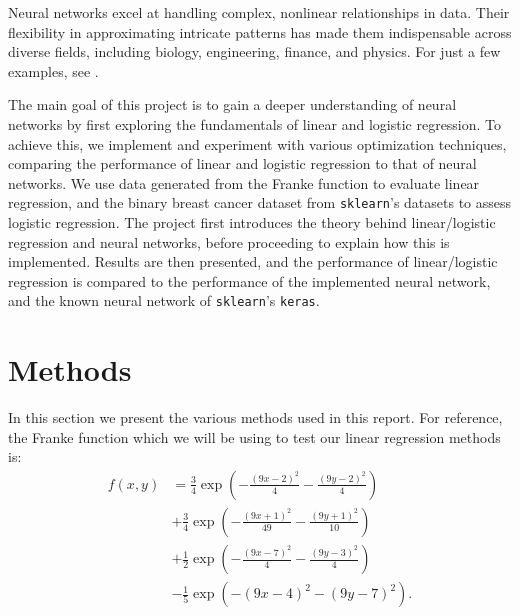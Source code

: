 \documentclass[%
reprint,s
amsmath,amssymb,
aps,
]{revtex4-2}
\begin{document}
Neural networks excel at handling complex, nonlinear relationships in data. Their flexibility in approximating intricate patterns has made them indispensable across diverse fields, including biology, engineering, finance, and physics. For just a few examples, see \cite{dawid2023modernapplicationsmachinelearning,thapar2023applicationsmachinelearningmodelling,mohammadi2022applicationsmachinelearninghealthcare}.

The main goal of this project is to gain a deeper understanding of neural networks by first exploring the fundamentals of linear and logistic regression. To achieve this, we implement and experiment with various optimization techniques, comparing the performance of linear and logistic regression to that of neural networks. We use data generated from the Franke function to evaluate linear regression, and the binary breast cancer dataset from \texttt{sklearn}'s datasets \cite{sklearn} to assess logistic regression. The project first introduces the theory behind linear/logistic regression and neural networks, before proceeding to explain how this is implemented. Results are then presented, and the performance of linear/logistic regression is compared to the performance of the implemented neural network, and the known neural network of \texttt{sklearn}'s \texttt{keras}.

\section{Methods}
In this section we present the various methods used in this report. For reference, the Franke function which we will be using to test our linear regression methods is:
\begin{align}	\label{eq:franke}
	f(x,y)&=\frac{3}{4}\exp(-\frac{(9x-2)^2}{4}-\frac{(9y-2)^2}{4})\nonumber\\
	&+\frac{3}{4}\exp(-\frac{(9x+1)^2}{49}-\frac{(9y+1)^2}{10})\nonumber\\
	&+\frac{1}{2}\exp(-\frac{(9x-7)^2}{4}-\frac{(9y-3)^2}{4})\nonumber\\
	&-\frac{1}{5}\exp(-(9x-4)^2-(9y-7)^2).
\end{align}
\end{document}
